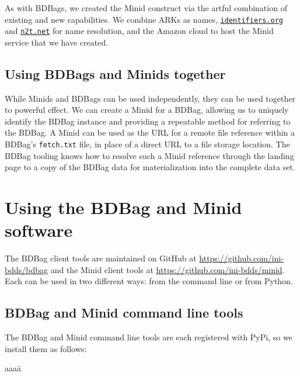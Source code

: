 \documentclass[11pt]{article}
\begin{document}
As with BDBags, we created the Minid construct via the artful combination of existing and new capabilities.
We combine ARKs as names, 
\texttt{\href{https://identifiers.org}{identifiers.org}} and \texttt{\href{https://n2t.net}{n2t.net}} for name resolution,
and the Amazon cloud to host the Minid service that we have created. 


\subsection{Using BDBags and Minids together} 

While Minids and BDBags can be used independently, they can be used together to powerful effect. 
We can create a Minid for a BDBag, 
allowing us to uniquely identify the BDBag instance and providing a repeatable method for referring to the BDBag. 
A Minid can be used as the URL for a remote file reference within a BDBag's \texttt{fetch.txt} file,
in place of a direct URL to a file storage location.  
The BDBag tooling knows how to resolve such a Minid reference
through the landing page to a copy of the BDBag data
for materialization into the complete data set.  


\section{Using the BDBag and Minid software}

The BDBag client tools are maintained on GitHub at \url{https://github.com/ini-bdds/bdbag} and the 
Minid client tools at \url{https://github.com/ini-bdds/minid}.
Each can be used in two different ways: from the command line or from Python.

\subsection{BDBag and Minid command line tools} 

The BDBag and Minid command line tools are each registered with PyPi, 
so we install them as follows:
\vspace{-2ex}
\begin{tabbing}
aaaa\=\kill
\>\\
\>
\end{tabbing}
\end{document}
